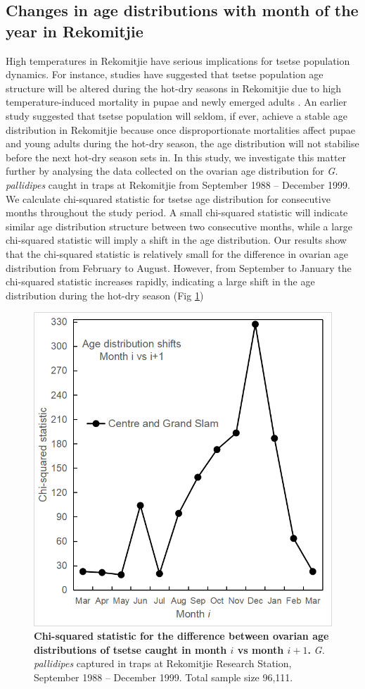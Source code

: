 \documentclass[12pt,a4paper]{article}
\begin{document}
\newpage
\subsection*{Changes in age distributions with month of the year in Rekomitjie}
High temperatures in Rekomitjie have serious implications for tsetse population dynamics. For instance, studies have suggested that tsetse population age structure will be altered during the hot-dry seasons in Rekomitjie due to high temperature-induced mortality in pupae and newly emerged adults \cite{Hargrove2013b,hargrove2015mortality,Ackley2017}. An earlier study \cite{VanSickle1988} suggested that tsetse population will seldom, if ever, achieve a stable age distribution in Rekomitjie because once disproportionate mortalities affect pupae and young adults during the hot-dry season, the age distribution will not stabilise before the next hot-dry season sets in. In this study, we investigate this matter further by analysing the data collected on the ovarian age distribution for \textit{G. pallidipes} caught in traps at Rekomitjie from September 1988 – December 1999. We calculate chi-squared statistic for tsetse age distribution for consecutive months throughout the study period. A small chi-squared statistic will indicate similar age distribution structure between two consecutive months, while a large chi-squared statistic will imply a shift in the age distribution.  Our results show that the chi-squared statistic   is relatively small for the difference in ovarian age distribution from February to August. However, from September to January the chi-squared statistic increases rapidly, indicating a large shift in the age distribution during the hot-dry season (Fig \ref{fig:ChiSqrSttistic})

\begin{figure}[hbt!]
	\centering
	\includegraphics[width=0.7\linewidth]{ChiSqrSttistic}
	\caption{{\bf Chi-squared statistic for the difference between ovarian age distributions of tsetse caught in month $i$ vs month $i+1$.} \textit{G. pallidipes} captured in traps at Rekomitjie Research Station, September 1988 – December 1999. Total sample size 96,111. }
	\label{fig:ChiSqrSttistic}
\end{figure}
\end{document}
